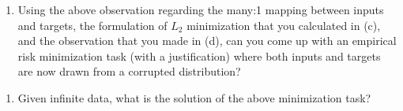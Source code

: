 \begin{enumerate}[resume]
\item Using the above observation regarding the many:1 mapping between inputs and targets, the formulation of $L_2$ minimization that you calculated in (c), and the observation that you made in (d), can you come up with an empirical risk minimization task (with a justification) where both inputs and targets are now drawn from a corrupted distribution?
\end{enumerate}

\begin{enumerate}[resume]
\item Given infinite data, what is the solution of the above minimization task?
\end{enumerate}